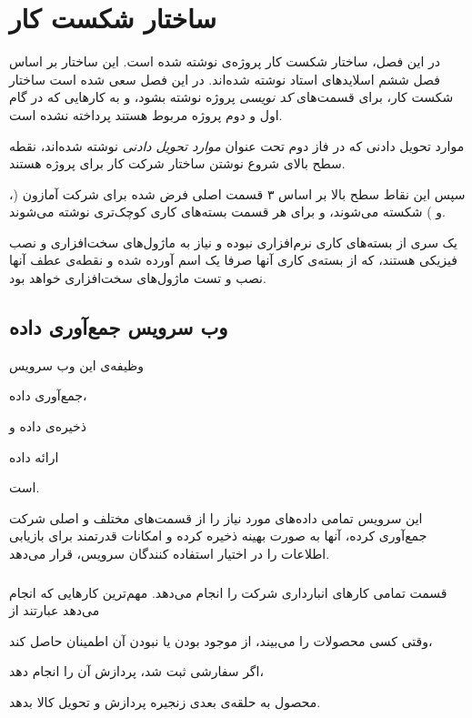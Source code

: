 \chapter{ساختار شکست کار}
در این فصل، ساختار شکست کار پروژه‌ی
نوشته شده است. این ساختار بر اساس فصل ششم اسلاید‌های استاد نوشته شده‌اند. در این فصل سعی شده است ساختار شکست کار، برای قسمت‌های \textit{کد نویسی} پروژه نوشته بشود، و به کارهایی که در گام اول و دوم پروژه مربوط هستند پرداخته نشده ‌است.

موارد تحویل دادنی که در فاز دوم تحت عنوان \textit{موارد تحویل دادنی} نوشته شده‌اند، نقطه سطح بالای شروع نوشتن ساختار شرکت کار برای پروژه 
هستند.

سپس این نقاط سطح بالا بر اساس ۳ قسمت اصلی فرض شده برای شرکت آمازون (،  و ) شکسته می‌شوند، و برای هر قسمت بسته‌های کاری کوچک‌تری نوشته می‌شوند.

یک سری از بسته‌های کاری نرم‌افزاری نبوده و نیاز به ماژول‌های سخت‌افزاری و نصب فیزیکی هستند، که از بسته‌ی کاری آنها صرفا یک اسم آورده شده و نقطه‌ی عطف آنها نصب و تست ماژول‌‌های سخت‌افزاری خواهد بود.


\section{وب سرویس جمع‌آوری داده}
وظیفه‌ی این وب سرویس
\begin{enumerate*}
\item 
جمع‌آوری داده،
\item 
ذخیره‌ی داده و
\item 
ارائه داده
\end{enumerate*}
است.

این سرویس تمامی داده‌های مورد نیاز را از قسمت‌های مختلف و اصلی شرکت جمع‌آوری کرده، آنها به صورت بهینه ذخیره کرده و امکانات قدرتمند برای بازیابی اطلاعات را در اختیار استفاده کنندگان سرویس، قرار می‌دهد.

\subsection{}
قسمت  تمامی کار‌‌های انبار‌داری شرکت را انجام می‌دهد. مهم‌ترین کار‌هایی که انجام می‌دهد عبارتند از
\begin{enumerate*}
\item 
وقتی کسی محصولات را می‌بیند، از موجود بودن یا نبودن‌ آن اطمینان حاصل کند،
\item 
اگر سفارشی ثبت شد، پردازش آن را انجام دهد،

\item 
محصول به حلقه‌ی بعدی زنجیره پردازش و تحویل کالا بدهد.
\end{enumerate*}

